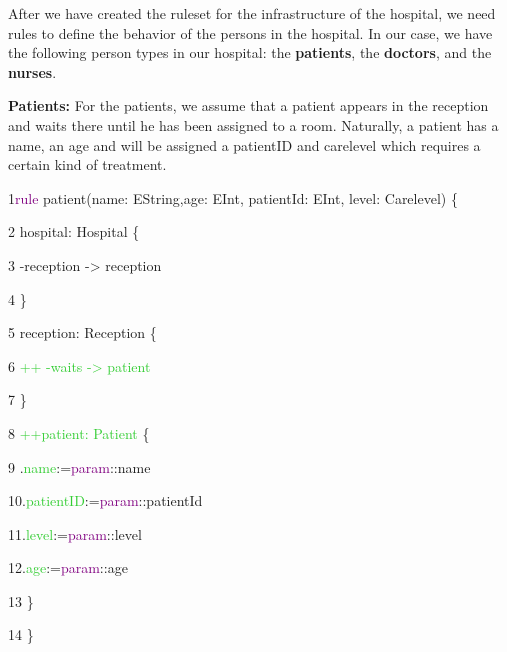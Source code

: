 After we have created the ruleset for the infrastructure of the hospital, we need rules to define the behavior of the persons in the hospital. In our case, we have the following person types in our hospital: the \textbf{patients}, the \textbf{doctors}, and the \textbf{nurses}.\newline

\textbf{Patients:}\newline
For the patients, we assume that a patient appears in the reception and waits there until he has been assigned to a room. Naturally, a patient has a name, an age and will be assigned a patientID and carelevel which requires a certain kind of treatment.\newline\newline

{

1\hspace{0.5cm}\textcolor{Purple}{rule} patient(name: EString,age: EInt, patientId: EInt, level: Carelevel) \{

2\hspace{1cm}	hospital: Hospital \{

3\hspace{1.5cm}	-reception -> reception 

4\hspace{1cm}	\}

5\hspace{1cm}	reception: Reception \{

6\hspace{1.5cm}	\textcolor{LimeGreen}{++ -waits -> patient }

7\hspace{1cm} \}

8\hspace{1cm}	\textcolor{LimeGreen}{++patient: Patient} \{

9\hspace{1.5cm} .\textcolor{LimeGreen}{name}:=\textcolor{Purple}{param}::name

10\hspace{1.5cm}.\textcolor{LimeGreen}{patientID}:=\textcolor{Purple}{param}::patientId

11\hspace{1.5cm}.\textcolor{LimeGreen}{level}:=\textcolor{Purple}{param}::level

12\hspace{1.5cm}.\textcolor{LimeGreen}{age}:=\textcolor{Purple}{param}::age

13\hspace{1cm} \}

14\hspace{0.5cm} \} \newline\newline

}

